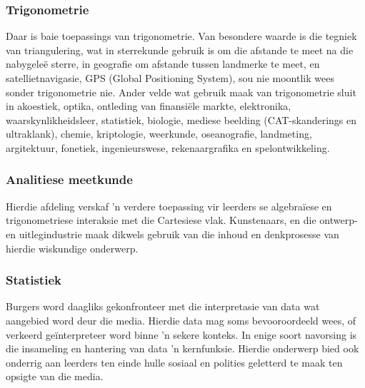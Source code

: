 \subsubsection{Trigonometrie}
Daar is baie toepassings van trigonometrie. Van besondere waarde is die tegniek van triangulering, wat in sterrekunde gebruik is om die afstande te meet na die nabygeleë sterre, in geografie om afstande tussen landmerke te meet, en satellietnavigasie, GPS (Global Positioning System), sou nie moontlik wees sonder trigonometrie nie. Ander velde wat gebruik maak van trigonometrie sluit in akoestiek,
optika, ontleding van finansiële markte, elektronika, waarskynlikheidsleer, statistiek, biologie, mediese beelding (CAT-skanderings en ultraklank), chemie, kriptologie, weerkunde, oseanografie, landmeting, argitektuur, fonetiek, ingenieurswese, rekenaargrafika en spelontwikkeling.

\subsubsection{Analitiese meetkunde}
Hierdie afdeling verskaf 'n verdere toepassing vir leerders se algebraïese en trigonometriese interaksie met die Cartesiese vlak. Kunstenaars, en die ontwerp- en uitlegindustrie maak dikwels gebruik van die inhoud en denkprosesse van hierdie wiskundige onderwerp.

\subsubsection{Statistiek}
Burgers word daagliks gekonfronteer met die interpretasie van data wat aangebied word deur die media. Hierdie data mag soms bevooroordeeld wees, of verkeerd geïnterpreteer word binne 'n sekere konteks. In enige soort navorsing is die insameling en hantering van data 'n kernfunksie. Hierdie onderwerp bied ook onderrig aan leerders ten einde hulle sosiaal en polities geletterd te maak ten opsigte van die media.

